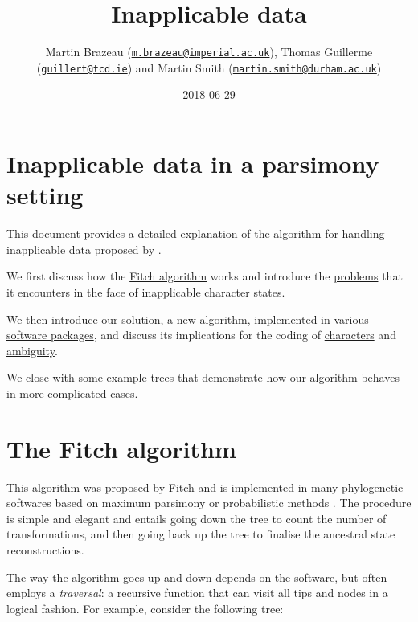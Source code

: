 \documentclass[]{book}
\title{Inapplicable data}
\author{Martin Brazeau
(\href{mailto:m.brazeau@imperial.ac.uk}{\nolinkurl{m.brazeau@imperial.ac.uk}}),
Thomas Guillerme
(\href{mailto:guillert@tcd.ie}{\nolinkurl{guillert@tcd.ie}}) and Martin
Smith
(\href{mailto:martin.smith@durham.ac.uk}{\nolinkurl{martin.smith@durham.ac.uk}})}
\date{2018-06-29}
\theoremstyle{definition}
\theoremstyle{definition}
\theoremstyle{definition}
\theoremstyle{remark}
\begin{document}
\maketitle

{
\setcounter{tocdepth}{1}
\tableofcontents
}
\hypertarget{inapplicable-data-in-a-parsimony-setting}{%
\chapter*{Inapplicable data in a parsimony
setting}\label{inapplicable-data-in-a-parsimony-setting}}

This document provides a detailed explanation of the algorithm for
handling inapplicable data proposed by \citet{Brazeau2018}.

We first discuss how the \protect\hyperlink{fitch}{Fitch algorithm}
works and introduce the \protect\hyperlink{problems}{problems} that it
encounters in the face of inapplicable character states.

We then introduce our \protect\hyperlink{solution}{solution}, a new
\protect\hyperlink{algorithm}{algorithm}, implemented in various
\protect\hyperlink{software}{software packages}, and discuss its
implications for the coding of \protect\hyperlink{coding}{characters}
and \protect\hyperlink{ambiguity}{ambiguity}.

We close with some \protect\hyperlink{examples}{example} trees that
demonstrate how our algorithm behaves in more complicated cases.

\hypertarget{fitch}{%
\chapter{The Fitch algorithm}\label{fitch}}

This algorithm was proposed by Fitch \citeyearpar{Fitch1971} and is
implemented in many phylogenetic softwares based on maximum parsimony
\citep{swofford2001paup, Goloboff2016} or probabilistic methods
\citep{Ronquist2012mrbayes, Stamatakis2014}. The procedure is simple and
elegant and entails going down the tree to count the number of
transformations, and then going back up the tree to finalise the
ancestral state reconstructions.

The way the algorithm goes up and down depends on the software, but
often employs a \emph{traversal}: a recursive function that can visit
all tips and nodes in a logical fashion. For example, consider the
following tree:
\end{document}
